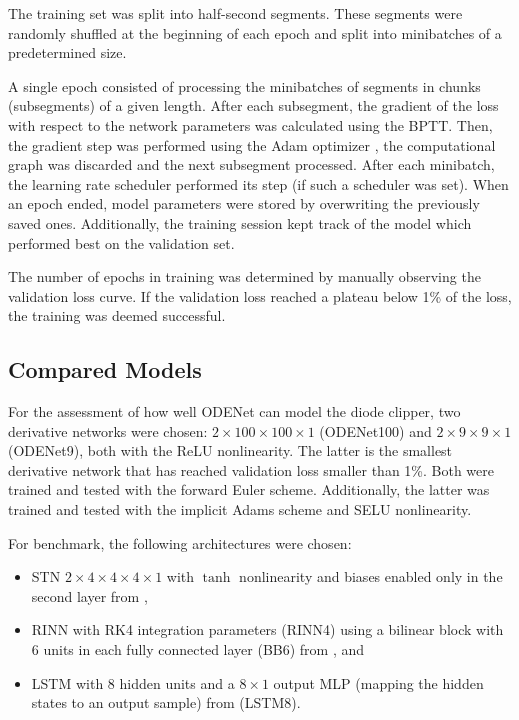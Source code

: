 The training set was split into half-second segments. These segments were randomly shuffled at the beginning of each epoch and split into minibatches of a predetermined size.

A single epoch consisted of processing the minibatches of segments in chunks (subsegments) of a given length. After each subsegment, the gradient of the loss with respect to the network parameters was calculated using the \ac{BPTT}. Then, the gradient step was performed using the Adam optimizer \cite{Kingma2017}, the computational graph was discarded and the next subsegment processed. After each minibatch, the learning rate scheduler performed its step (if such a scheduler was set). When an epoch ended, model parameters were stored by overwriting the previously saved ones. Additionally, the training session kept track of the model which performed best on the validation set.

The number of epochs in training was determined by manually observing the validation loss curve. If the validation loss reached a plateau below 1\% of the loss, the training was deemed successful.

\subsection{Compared Models}
\label{sec:diode_clipper_models}

For the assessment of how well ODENet can model the diode clipper, two derivative networks were chosen: $2 \times 100 \times 100 \times 1$ (ODENet100) and $2 \times 9 \times 9 \times 1$ (ODENet9), both with the \ac{ReLU} nonlinearity. The latter is the smallest derivative network that has reached validation loss smaller than 1\%. Both were trained and tested with the forward Euler scheme. Additionally, the latter was trained and tested with the implicit Adams scheme and \ac{SELU} nonlinearity.

For benchmark, the following architectures were chosen:
\begin{itemize}
    \item \ac{STN} $2 \times 4 \times 4 \times 4 \times 1$ with $\tanh$ nonlinearity and biases enabled only in the second layer from \cite{Parker2019}, 
    \item \ac{RINN} with \ac{RK}4 integration parameters (\ac{RINN}4) using a bilinear block with 6 units in each fully connected layer (BB6) from \cite{Ouala2019}, and 
    \item \ac{LSTM} with 8 hidden units and a $8 \times 1$ output \ac{MLP} (mapping the hidden states to an output sample) from \cite{Wright2019} (\ac{LSTM}8).
\end{itemize}

